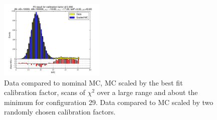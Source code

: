 \begin{figure}[htbp]
\begin{center}
\includegraphics[width=0.45\textwidth]{../FIGURES/29/FIG_Fit_result_for_calibration_factor_of_0_990.pdf} 
\caption{Data compared to nominal MC, MC scaled by the best fit calibration factor, scans of $\chi^2$ over a large range and about the minimum for configuration 29. Data compared to MC scaled by two randomly chosen calibration factors.} 
\label{tab:best_29} 
\end{center} \end{figure} 

